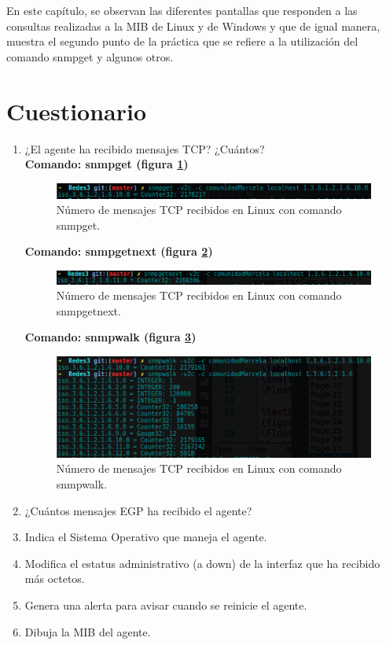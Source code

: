 En este capítulo, se observan las diferentes pantallas que responden a las consultas realizadas a la MIB de Linux y de Windows y que de igual manera, muestra el segundo punto de la práctica que se refiere a la utilización del comando snmpget y algunos otros.
\section{Cuestionario}
\begin{enumerate}


\item ¿El agente ha recibido mensajes TCP? ¿Cuántos?\\
\textbf{Comando: snmpget (figura \ref{image:tcpget})}
\FloatBarrier
\begin{figure}[htbp!]
		\centering
	\includegraphics[width=.9 \textwidth]{images/tcpget}
		\caption{Número de mensajes TCP recibidos en Linux con comando snmpget.}		\label{image:tcpget}
\end{figure}
\FloatBarrier

\textbf{Comando: snmpgetnext (figura \ref{image:tcpnext})}
\FloatBarrier
\begin{figure}[htbp!]
		\centering
	\includegraphics[width=.9 \textwidth]{images/tcpnext}
		\caption{Número de mensajes TCP recibidos en Linux con comando snmpgetnext.}		\label{image:tcpnext}
\end{figure}
\FloatBarrier

\textbf{Comando: snmpwalk (figura \ref{image:tcpwalk})}
\FloatBarrier
\begin{figure}[htbp!]
		\centering
	\includegraphics[width=.9 \textwidth]{images/tcpwalk}
		\caption{Número de mensajes TCP recibidos en Linux con comando snmpwalk.}		\label{image:tcpwalk}
\end{figure}
\FloatBarrier
\item ¿Cuántos mensajes EGP ha recibido el agente?

\item Indica el Sistema Operativo que maneja el agente.
\item Modifica el estatus administrativo (a down) de la interfaz que ha recibido más octetos.
\item Genera una alerta para avisar cuando se reinicie el agente.
\item Dibuja la MIB del agente.
\end{enumerate}